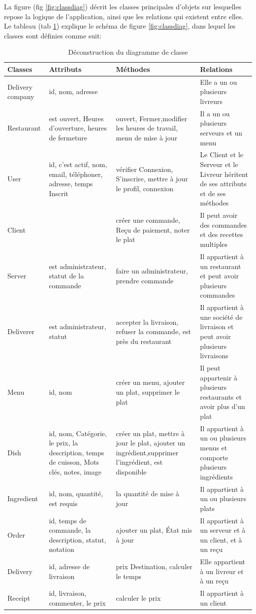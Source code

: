 \documentclass[french, a4paper, 12pt]{report}
\begin{document}
			La figure (fig \ref{fig:classdiag}) décrit les classes principales d'objets sur lesquelles repose la logique de l'application, ainsi que les relations qui existent entre elles.
			\newpage
			Le tableau (tab \ref{tab:classdiag}) explique le schéma de figure \ref{fig:classdiag}, dans lequel les classes sont définies comme suit:
			
			\begin{table}[!h!]
  				\begin{tabular}{lp{3cm}p{3cm}p{6cm}}
    					Classes & Attributs & Méthodes & Relations \\ 

					\hline
Delivery company & id, nom, adresse & & Elle a un ou plusieurs livreurs \\
\hline
Restaurant & est ouvert, Heures d'ouverture, heures de fermeture & ouvert, Fermer,modifier les heures de travail, menu de mise à jour &  Il a un ou plusieurs serveurs et un menu \\
\hline
User & id, c'est actif, nom, email, téléphoner, adresse, temps Inscrit & vérifier Connexion, S'inscrire, mettre à jour le profil, connexion & Le Client et le Serveur et le Livreur héritent de ses attributs et de ses méthodes \\
\hline
Client & & créer une commande, Reçu de paiement, noter le plat & Il peut avoir des commandes et des recettes multiples \\
\hline
Server & est administrateur, statut de la commande & faire un administrateur, prendre commande & Il appartient à un restaurant et peut avoir plusieurs commandes \\
\hline
Deliverer & est administrateur, statut & accepter la livraison, refuser la commande, est près du restaurant & Il appartient à une société de livraison et peut avoir plusieurs livraisons \\
\hline
Menu & id, nom & créer un menu, ajouter un plat, supprimer le plat & Il peut appartenir à plusieurs restaurants et avoir plus d’un plat \\
\hline
Dish & id, nom, Catégorie, le prix, la description, temps de cuisson, Mots clés, notes, image & créer un plat, mettre à jour le plat, ajouter un ingrédient,supprimer l'ingrédient, est disponible & Il appartient à un ou plusieurs menus et comporte plusieurs ingrédients \\
\hline
Ingredient & id, nom, quantité, est requis & la quantité de mise à jour & Il appartient à un ou plusieurs plats \\
\hline
Order & id, temps de commande, la description, statut, notation & ajouter un plat, État mis à jour & Il appartient à un serveur et à un client, et à un reçu \\
\hline
Delivery & id, adresse de livraison & prix Destination, calculer le temps & Elle appartient à un livreur et à un reçu \\
\hline
Receipt & id, livraison, commenter, le prix & calculer le prix & Il appartient à un client \\
    					
  				\end{tabular}
  				\caption{Déconstruction du diagramme de classe}
  				\label{tab:classdiag}
			\end{table}
\end{document}
